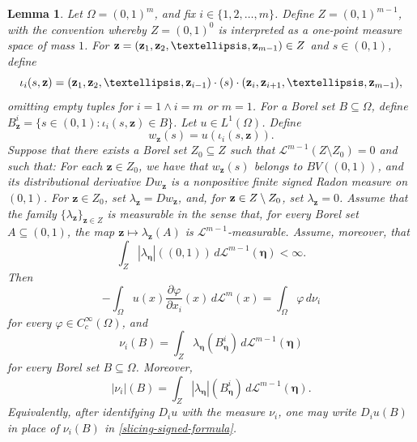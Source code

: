 \documentclass[10pt,a4paper]{amsart}
\newtheorem{lemma}{Lemma}%
\begin{document}
\begin{lemma}\label{lem:slicing-partial-variation}%
 Let $\Omega=(0,1)^m$, and fix \(i\in\{1,2,\ldots,m\}\). Define $ Z=(0,1)^{m-1}$, with the convention  whereby  $Z=(0,1)^0$ is interpreted as a
 one-point measure space of mass $1$. For $  \text{{\bf z}} = (\mathbf z_1,\mathbf z_2,\ldots,\mathbf z_{m-1}) \in Z $
and \(s\in(0,1)\), define
\begin{equation}\label{defineiota}
\iota_i(s,\mathbf z)
= (\mathbf z_1,\mathbf z_2,\ldots,\mathbf z_{i-1}) \cdot 
(s) \cdot ( \text{{\bf z}}_i,\mathbf z_{i+1},\ldots,\mathbf z_{m-1}),
\end{equation}
  omitting empty tuples              for  $i = 1 \wedge i=m$ or
\(m=1\). For a Borel set \(B\subseteq\Omega\), define
$
B_{\mathbf z}^{i}
=
\{s\in(0,1):\iota_i(s,\mathbf z)\in B\}$.
 Let \(u\in L^1(\Omega)\). Define 
\begin{equation}\label{wbfs}
 w_{\mathbf z}(s)=u(\iota_i(s,\mathbf z)). 
\end{equation}
 Suppose that there exists a Borel set
\(Z_0\subseteq Z\) such that $ \mathcal L^{m-1}(Z\setminus Z_0)=0 $ and such that:  For each \(\mathbf z\in Z_0\), we have that 
 $w_{\mathbf z}(s) $ 
belongs to \(BV((0,1))\), and its distributional derivative \(Dw_{\mathbf z}\)
is a nonpositive finite signed Radon measure on \((0,1)\).
For \(\mathbf z\in Z_0\), set
$
\lambda_{\mathbf z}=Dw_{\mathbf z}$, 
and, for $ \text{{\bf z}} \in Z\setminus Z_0$, set
$
\lambda_{\mathbf z}=0$.
Assume that the family \(\{\lambda_{\mathbf z}\}_{\mathbf z\in Z}\) is
measurable in the sense that, for every Borel set \(A\subseteq(0,1)\), the map
$
\mathbf z\mapsto \lambda_{\mathbf z}(A) $
 is $\mathcal{L}^{m-1}$-measurable. Assume, moreover, that
\begin{equation}\label{slicing-integrability-condition}
\int_Z
|\lambda_{\boldsymbol\eta}|((0,1))
\,d\mathcal L^{m-1}(\boldsymbol\eta)
<\infty.
\end{equation}
 Then 
$$
-\int_\Omega u(x)\frac{\partial\varphi}{\partial x_i}(x)\,
d\mathcal L^m(x)
=
\int_\Omega \varphi\,d\nu_i
$$
for every \(\varphi\in C_c^\infty(\Omega)\), and   
\begin{equation}\label{slicing-signed-formula}
\nu_i(B) =   \int_Z
\lambda_{\boldsymbol\eta}(B_{\boldsymbol\eta}^{i})
\,d\mathcal L^{m-1}(\boldsymbol\eta) 
\end{equation}
 for every Borel set
$B\subseteq\Omega$.  Moreover,
\begin{equation}\label{slicing-variation-formula}
|\nu_i|(B)
=
\int_Z
|\lambda_{\boldsymbol\eta}|(B_{\boldsymbol\eta}^{i})
\,d\mathcal L^{m-1}(\boldsymbol\eta).
\end{equation}
Equivalently, after identifying \(D_i u\) with the measure \(\nu_i\), one may
write \(D_i u(B)\) in place of \(\nu_i(B)\) in
\eqref{slicing-signed-formula}.
\end{lemma}
\end{document}
